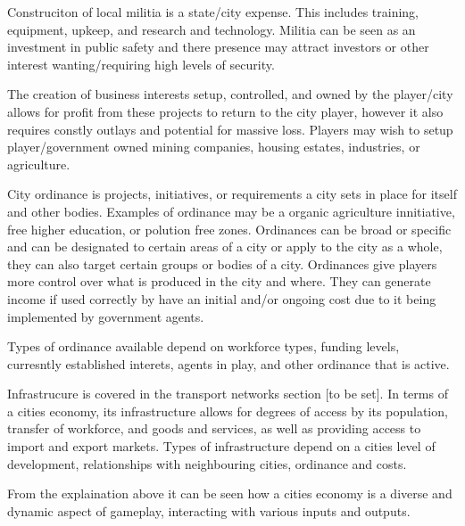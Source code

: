 Construciton of local militia is a state/city expense. This includes training, equipment, upkeep, and research and technology. Militia can be seen as an investment in public safety and there presence may attract investors or other interest wanting/requiring high levels of security.




The creation of business interests setup, controlled, and owned by the player/city allows for profit from these projects to return to the city player, however it also requires constly outlays and potential for massive loss. Players may wish to setup player/government owned mining companies, housing estates, industries, or agriculture. 



City ordinance is projects, initiatives, or requirements a city sets in place for itself and other bodies. Examples of ordinance may be a organic agriculture innitiative, free higher education, or polution free zones. Ordinances can be broad or specific and can be designated to certain areas of a city or apply to the city as a whole, they can also target certain groups or bodies of a city. Ordinances give players more control over what is produced in the city and where. They can generate income if used correctly by have an initial and/or ongoing cost due to it being implemented by government agents.

Types of ordinance available depend on workforce types, funding levels, curresntly established interets, agents in play, and other ordinance that is active. 




Infrastrucure is covered in the transport networks section [to be set]. In terms of a cities economy, its infrastructure allows for degrees of access by its population, transfer of workforce, and goods and services, as well as providing access to import and export markets. Types of infrastructure depend on a cities level of development, relationships with neighbouring cities, ordinance and costs. 


From the explaination above it can be seen how a cities economy is a diverse and dynamic aspect of gameplay, interacting with various inputs and outputs. 





